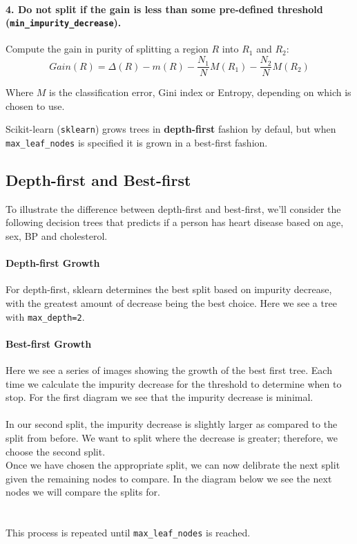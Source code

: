 \documentclass[11pt,a4paper]{report}
\newcommand{\mysubsection}[1]{%
    \subsection{#1}%
    \addcontentsline{toc}{subsection}{#1}%
}
\begin{document}
\paragraph{4. Do not split if the gain is less than some pre-defined threshold (\texttt{min\_impurity\_decrease}).}Compute the gain in purity of splitting a region $R$ into $R_1$ and $R_2$:$$Gain(R) = \Delta(R) - m(R) - \frac{N_1}{N}M(R_1) - \frac{N_2}{N}M(R_2)$$
\begin{framed}
Where $M$ is the 	classification error, Gini index or Entropy, depending on which is chosen to use.
\end{framed}
Scikit-learn (\texttt{sklearn}) grows trees in \textbf{depth-first} fashion by defaul, but when \texttt{max\_leaf\_nodes} is specified it is grown in a best-first fashion.
\mysubsection{Depth-first and Best-first}
To illustrate the difference between depth-first and best-first, we’ll consider the following decision trees that predicts if a person has heart disease based on age, sex, BP and cholesterol.
\paragraph{Depth-first Growth}For depth-first, sklearn determines the best split based on impurity decrease, with the greatest amount of decrease being the best choice. Here we see a tree with \texttt{max\_depth=2}.\\
\paragraph{Best-first Growth}Here we see a series of images showing the growth of the best first tree. Each time we calculate the impurity decrease for the threshold to determine when to stop. For the first diagram we see that the impurity decrease is minimal.\\
\\
In our second split, the impurity decrease is slightly larger as compared to the split from before. We want to split where the decrease is greater; therefore, we choose the second split.\\
Once we have chosen the appropriate split, we can now delibrate the next split given the remaining nodes to compare. In the diagram below we see the next nodes we will compare the splits for.\\
\\\\
This process is repeated until \texttt{max\_leaf\_nodes} is reached.
\end{document}
